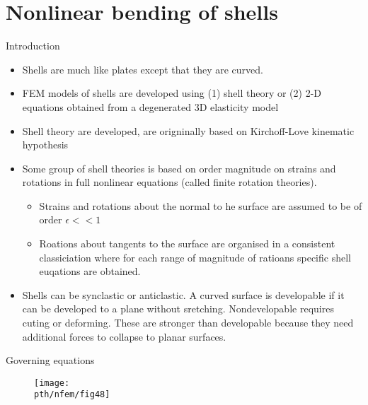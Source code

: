 \section{Nonlinear bending of shells}

	
	\begin{frame}{Introduction}
		\begin{itemize}
			\item Shells are much like plates except that they are curved. 
			\item FEM models of shells are developed using (1) shell theory or (2) 2-D equations obtained from a degenerated 3D elasticity model 
			\item Shell theory are developed, are origninally based on Kirchoff-Love kinematic hypothesis
			\item Some group of shell theories is based on order magnitude on strains and rotations in full nonlinear equations (called finite rotation theories). 
			\begin{itemize}
				\item Strains and rotations about the normal to he surface are assumed to be of order $\epsilon<<1$
				\item Roations about tangents to the surface are organised in a consistent classiciation where for each range of magnitude of ratioans specific shell euqations are obtained. 
			\end{itemize}
		\item Shells can be synclastic or anticlastic. A curved surface is developable if it can be developed to a plane without sretching. Nondevelopable requires cuting or deforming. These are stronger than developable because they need additional forces to collapse to planar surfaces. 
		\end{itemize}
	\end{frame}


	\begin{frame}{Governing equations}
		\begin{figure}
			\centering
			\texttt{[image: \\pth/nfem/fig48]}  		
		\end{figure}
	\end{frame}


